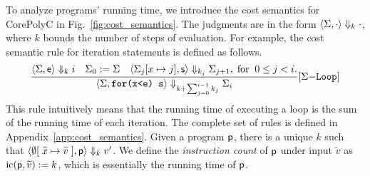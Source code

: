 \documentclass[runningheads]{llncs}
\begin{document}
To analyze programs' running time, we introduce the cost semantics for CorePolyC in Fig.~\ref{fig:cost_semantics}.
The judgments are in the form $\cost{\Sigma}{\cdot}{\cdot}{k}$, where $k$ bounds the number of steps of evaluation.
For example, the cost semantic rule for iteration statements is defined as follows.
\[
\srule{\cost{\Sigma}{\e}{i}{k}\quad\Sigma_0:=\Sigma\quad\cost{\Sigma_{j}[x\mapsto j]}{\s}{\Sigma_{j+1}}{k_j},\;\text{for}\;\;0\le j< i.}{\cost{\Sigma}{\texttt{\textbf{for}(x<e) s}}{\Sigma_{i}}{k+\sum_{j=0}^{i-1}k_j}}{Loop}
\]
This rule intuitively means that the running time of executing a loop is the sum of the running time of each iteration.
The complete set of rules is defined in Appendix~\ref{app:cost_semantics}.
Given a program $\p$,  there is a unique $k$ such that $\cost{\emptyset[\;\widetilde{x}\mapsto\widetilde{v}\;]}{\p}{v'}{k}$.
We define the \textit{instruction count} of $\p$ under input $\widetilde{v}$ as $\ic(\p,\widetilde{v}):=k$, which is essentially the running time of $\p$.
\end{document}
